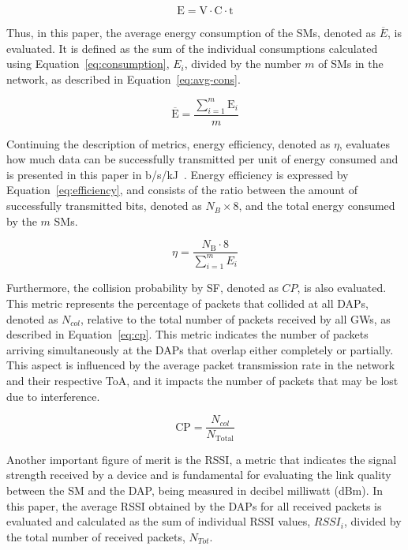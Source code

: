 \documentclass[a4paper,fleqn]{cas-dc}
\begin{document}
\begin{equation} \label{eq:consumption}
    \text{E} = \text{V} \cdot \text{C} \cdot \text{t}
\end{equation}

Thus, in this paper, the average energy consumption of the \gls{SMs}, denoted as \( \overline{E} \), is evaluated. It is defined as the sum of the individual consumptions calculated using Equation~\ref{eq:consumption}, \( E_{i} \), divided by the number \( m \) of \gls{SMs} in the network, as described in Equation~\ref{eq:avg-cons}.

\begin{equation} \label{eq:avg-cons}
    \overline{\text{E}} = \frac{\sum \limits_{i=1}^{m} \text{E}_{i}}{m}
\end{equation}

Continuing the description of metrics, energy efficiency, denoted as \( \eta \), evaluates how much data can be successfully transmitted per unit of energy consumed and is presented in this paper in b/s/kJ~\cite{banti2022lorawan}. Energy efficiency is expressed by Equation~\ref{eq:efficiency}, and consists of the ratio between the amount of successfully transmitted bits, denoted as \( N_{B} \times 8 \), and the total energy consumed by the \( m \) \gls{SMs}.

\begin{equation} \label{eq:efficiency}
    \eta = \frac{N_{\text{B}} \cdot 8}{\sum \limits_{i=1}^{m} E_{i}}
\end{equation}

Furthermore, the collision probability by \gls{SF}, denoted as \( CP \), is also evaluated. This metric represents the percentage of packets that collided at all \gls{DAPs}, denoted as \( N_{col} \), relative to the total number of packets received by all \gls{GWs}, as described in Equation~\ref{eq:cp}. This metric indicates the number of packets arriving simultaneously at the \gls{DAPs} that overlap either completely or partially. This aspect is influenced by the average packet transmission rate in the network and their respective \gls{ToA}, and it impacts the number of packets that may be lost due to interference.

\begin{equation} \label{eq:cp}
    \text{CP} = \frac{N_{col}}{N_{\text{Total}}}
\end{equation}

Another important figure of merit is the \gls{RSSI}, a metric that indicates the signal strength received by a device and is fundamental for evaluating the link quality between the SM and the DAP, being measured in decibel milliwatt (dBm). In this paper, the average \gls{RSSI} obtained by the \gls{DAPs} for all received packets is evaluated and calculated as the sum of individual \gls{RSSI} values, \( RSSI_{i} \), divided by the total number of received packets, \( N_{Tot} \).
\end{document}
